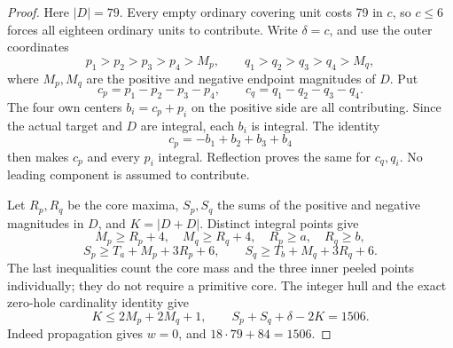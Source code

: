\documentclass[11pt,a4paper]{article}
\theoremstyle{remark}
\begin{document}
\begin{proof}
Here $|D|=79$. Every empty ordinary covering unit costs 79 in $c$,
so $c\le6$ forces all eighteen ordinary units to contribute. Write
$\delta=c$, and use the outer coordinates
\[
 p_1>p_2>p_3>p_4>M_p,\qquad
 q_1>q_2>q_3>q_4>M_q,
\]
where $M_p,M_q$ are the positive and negative endpoint magnitudes of
$D$. Put
\[
 c_p=p_1-p_2-p_3-p_4,\qquad c_q=q_1-q_2-q_3-q_4.
\]
The four own centers $b_i=c_p+p_i$ on the positive side are all
contributing. Since the actual target and $D$ are integral, each $b_i$
is integral. The identity
\[
 c_p=-b_1+b_2+b_3+b_4
\]
then makes $c_p$ and every $p_i$ integral. Reflection proves the same
for $c_q,q_i$. No leading component is assumed to contribute.

Let $R_p,R_q$ be the core maxima, $S_p,S_q$ the sums of the positive
and negative magnitudes in $D$, and $K=|D+D|$. Distinct integral
points give
\[
 M_p\ge R_p+4,\quad M_q\ge R_q+4,\quad R_p\ge a,\quad R_q\ge b,
\]
\[
 S_p\ge T_a+M_p+3R_p+6,\qquad
 S_q\ge T_b+M_q+3R_q+6.
\]
The last inequalities count the core mass and the three inner peeled
points individually; they do not require a primitive core. The integer
hull and the exact zero-hole cardinality identity give
\[
 K\le2M_p+2M_q+1,\qquad S_p+S_q+\delta-2K=1506.
\]
Indeed propagation gives $w=0$, and $18\cdot79+84=1506$.


\end{proof}
\end{document}
